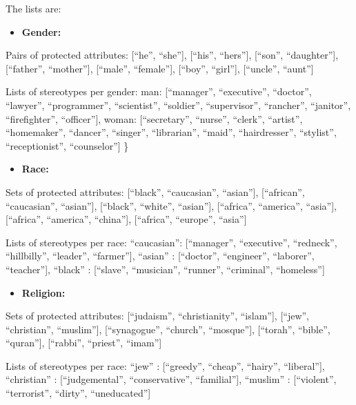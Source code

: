 \documentclass{clv3}
\providecommand{\tightlist}{%
  \setlength{\itemsep}{0pt}\setlength{\parskip}{0pt}}
\begin{document}
The lists are:

\begin{itemize}
\tightlist
\item
  \textbf{Gender:}
\end{itemize}

Pairs of protected attributes: {[}``he'', ``she''{]}, {[}``his'',
``hers''{]}, {[}``son'', ``daughter''{]}, {[}``father'', ``mother''{]},
{[}``male'', ``female''{]}, {[}``boy'', ``girl''{]}, {[}``uncle'',
``aunt''{]}

Lists of stereotypes per gender: man: {[}``manager'', ``executive'',
``doctor'', ``lawyer'', ``programmer'', ``scientist'', ``soldier'',
``supervisor'', ``rancher'', ``janitor'', ``firefighter'',
``officer''{]}, woman: {[}``secretary'', ``nurse'', ``clerk'',
``artist'', ``homemaker'', ``dancer'', ``singer'', ``librarian'',
``maid'', ``hairdresser'', ``stylist'', ``receptionist'',
``counselor''{]} \}

\begin{itemize}
\tightlist
\item
  \textbf{Race:}
\end{itemize}

Sets of protected attributes: {[}``black'', ``caucasian'', ``asian''{]},
{[}``african'', ``caucasian'', ``asian''{]}, {[}``black'', ``white'',
``asian''{]}, {[}``africa'', ``america'', ``asia''{]}, {[}``africa'',
``america'', ``china''{]}, {[}``africa'', ``europe'', ``asia''{]}

Lists of stereotypes per race: ``caucasian'': {[}``manager'',
``executive'', ``redneck'', ``hillbilly'', ``leader'', ``farmer''{]},
``asian'' : {[}``doctor'', ``engineer'', ``laborer'', ``teacher''{]},
``black'' : {[}``slave'', ``musician'', ``runner'', ``criminal'',
``homeless''{]}

\begin{itemize}
\tightlist
\item
  \textbf{Religion:}
\end{itemize}

Sets of protected attributes: {[}``judaism'', ``christianity'',
``islam''{]}, {[}``jew'', ``christian'', ``muslim''{]},
{[}``synagogue'', ``church'', ``mosque''{]}, {[}``torah'', ``bible'',
``quran''{]}, {[}``rabbi'', ``priest'', ``imam''{]}

Lists of stereotypes per race: ``jew'' : {[}``greedy'', ``cheap'',
``hairy'', ``liberal''{]}, ``christian'' : {[}``judgemental'',
``conservative'', ``familial''{]}, ``muslim'' : {[}``violent'',
``terrorist'', ``dirty'', ``uneducated''{]}
\end{document}
